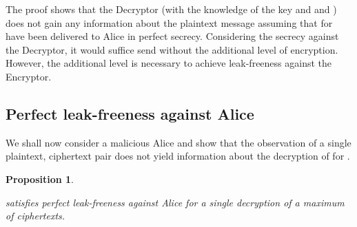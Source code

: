 \documentclass[10pt,journal]{IEEEtran}
\newtheorem{proposition}{Proposition}[section]
\begin{document}
The proof shows that the Decryptor (with the knowledge of the key  and  and )
does not gain any information
about the plaintext message 
assuming that
 for  have been delivered to Alice in perfect secrecy.
Considering the secrecy against the Decryptor, it would suffice send 
without the additional level of encryption.
However, the additional level is necessary
to achieve leak-freeness against the Encryptor.


\subsection{Perfect leak-freeness against Alice}

We shall now
consider a malicious Alice and
show that the observation of a single plaintext, ciphertext pair
 does not yield information about the decryption of  for .
\begin{proposition}
\label{prop:ConjE_secure}

satisfies
perfect leak-freeness against Alice for a single decryption
of a maximum of  ciphertexts.
\end{proposition}
\end{document}
